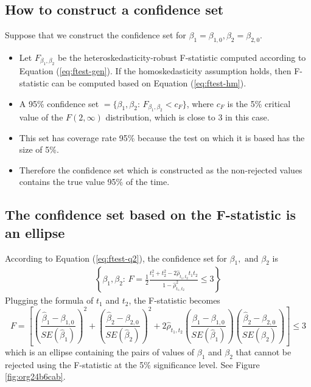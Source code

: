 \documentclass[a4paper,11pt]{article}
\begin{document}
\subsection{How to construct a confidence set}
\label{sec:org723c0f5}

Suppose that we construct the confidence set for \(\beta_1 =
\beta_{1,0}, \beta_2 = \beta_{2,0}\).

\begin{itemize}
\item Let \(F_{\beta_1, \beta_2}\) be the heteroskedasticity-robust
F-statistic computed according to Equation (\ref{eq:ftest-gen}). If the
homoskedasticity assumption holds, then F-statistic can be computed
based on Equation (\ref{eq:ftest-hm}).
\item A 95\% confidence set \(=\{\beta_1, \beta_2:\, F_{\beta_1,\beta_2} <
  c_F\}\), where \(c_F\) is the 5\% critical value of the \(F(2, \infty)\)
distribution, which is close to 3 in this case.
\item This set has coverage rate 95\% because the test on which it is based
has the size of 5\%.
\item Therefore the confidence set which is constructed as the non-rejected
values contains the true value 95\% of the time.
\end{itemize}


\subsection{The confidence set based on the F-statistic is an ellipse}
\label{sec:org28bf4c9}

According to Equation (\ref{eq:ftest-q2}), the confidence set for \(\beta_1, \text{ and } \beta_2\) is
\begin{gather*}
\left\{ \beta_1, \beta_2:\, F = \frac{1}{2}\frac{t^2_1 + t^2_2 - 2 \hat{\rho}_{t_1,t_2}t_1t_2}{1 - \hat{\rho}_{t_1,t_2}^2} \leq 3 \right\}
\end{gather*}
Plugging the formula of \(t_1\) and \(t_2\), the F-statistic becomes
\begin{equation*}
F = \left[ \left(\frac{\hat{\beta}_1 - \beta_{1,0}}{SE(\hat{\beta}_1)}\right)^2 + \left(\frac{\hat{\beta}_2 - \beta_{2,0}}{SE(\hat{\beta}_2)}\right)^2 + 2 \hat{\rho}_{t_1,t_2}\left(\frac{\hat{\beta}_1 - \beta_{1,0}}{SE(\hat{\beta}_1)}\right) \left(\frac{\hat{\beta}_2 - \beta_{2,0}}{SE(\hat{\beta}_2)}\right) \right] \leq 3
\end{equation*}
which is an ellipse containing the pairs of values of \(\beta_1\) and
\(\beta_2\) that cannot be rejected using the F-statistic at the 5\%
significance level. See Figure \ref{fig:org24b6cab}.
\end{document}
